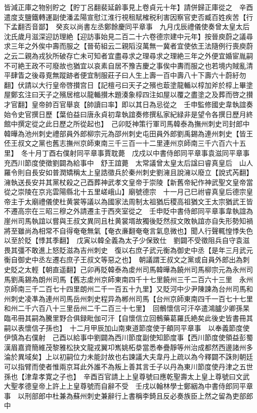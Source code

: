 皆減正庫之物别貯之【貯丁呂翻裴延齡事見上卷貞元十年】請併歸正庫從之　辛酉遣度支鹽鐵轉運副使潘孟陽宣慰江淮行視租賦榷税利害因察官吏否臧百姓疾苦【行下孟翻否音鄙】　癸亥以尚書左丞鄭餘慶同平章事　九月戊辰禮儀使奏曾太皇太后沈氏歲月滋深迎訪理絶【迎訪事始見二百二十六卷德宗建中元年】按晉庾蔚之議尋求三年之外俟中壽而服之【晉荀組云二親䧟沒萬無一冀者宜使依王法隨例行喪庾蔚之云二親為戎狄所破存亡未可知者宜盡尋求之理尋求之理絶三年之外便宜婚宦胤嗣不可絶王政不可廢故也猶宜以哀素自居不豫吉慶之事俟中夀而服之也若境内賊亂清平肆眚之後尋覔無蹤跡者便宜制服莊子曰人生上壽一百中壽八十下壽六十蔚紆勿翻】伏請以大行皇帝啓攅宫日【記檀弓曰天子之殯也菆塗龍輴以椁加斧於椁上畢塗屋鄭玄注曰天子之殯居棺以龍輴攅木題湊象椁四注如屋以覆之盡塗之及葬而啓之攅才官翻】皇帝帥百官舉哀【帥讀曰率】即以其日為忌從之　壬申監修國史韋執誼奏始令史官撰日歷【葉伯益曰唐永貞初韋執誼奏修撰私家紀緑非是望令各撰日歷月終館中撰定從之此日歷之所從起也】　己卯貶神策行軍司馬韓泰為撫州刺史司封郎中韓曄為池州刺史禮部員外郎柳宗元為邵州刺史屯田員外郎劉禹錫為連州刺史【皆王伾王叔文之黨也舊志撫州京師東南三千三百一十二里連州京師南三千六百六十五里】　冬十月丁酉右僕射同平章事賈耽薨　戊戍以中書侍郎同平章事袁滋同平章事充西川節度使徵劉闢為給事中　舒王誼薨　太常議曾太皇太后諡曰睿真皇后　山人羅令則自長安如普潤矯稱太上皇誥徵兵於秦州刺史劉澭且說澭以廢立【說式芮翻】澭執送長安并其黨杖殺之己酉葬神武孝文皇帝于崇陵【新舊帝紀作神武聖文皇帝當從之崇陵在京兆雲陽縣北十五里嵯峨山】廟號德宗　十一月己巳祔睿真皇后德宗皇帝主于太廟禮儀使杜黄裳等議以為國家法周制太祖猶后稷高祖猶文王太宗猶武王皆不遷高宗在三昭三穆之外請遷主于西夾室從之　壬申貶中書侍郎同平章事韋執誼為崖州司馬執誼以嘗與王叔文異同且杜黄裳壻故獨後貶然叔文敗執誼亦自失形勢知禍將至雖尚為相常不自得奄奄無氣【奄衣亷翻奄奄言氣息微也】聞人行聲輒惶悸失色以至於貶【悸其季翻】　戊寅以韓全義為太子少保致仕　劉闢不受徵阻兵自守袁滋畏其彊不敢進上怒貶滋為吉州刺史　復以右庶子武元衡為御史中丞【是年三月武元衡自御史中丞左遷右庶子王叔文等惡之也】　朝議謂王叔文之黨或自員外郎出為刺史貶之太輕【朝直遥翻】己卯再貶韓泰為䖍州司馬韓曄為饒州司馬柳宗元為永州司馬劉禹錫為朗州司馬【舊志䖍州京師東南四千十七里饒州三千二百六十三里　永州京師南三千二百七十四里朗州二千一百五十九里】又貶河中少尹陳諫為台州司馬和州刺史凌凖為連州司馬岳州刺史程异為郴州司馬【台州京師東南四千一百七十七里和州二千六百八十三里岳州二千二百三十七里】　回鶻懷信可汗卒遣鴻臚少卿孫杲臨弔冊其嗣為騰里野合俱録毗伽可汗【自懷信立回鶻藥葛羅氏絶矣此後史皆書冊其嗣以表懷信子孫也】　十二月甲辰加山南東道節度使于頔同平章事　以奉義節度使伊慎為右僕射　己酉以給事中劉闢為西川節度副使知節度事【西川節度使領益彭蜀漢眉嘉資簡維茂黎雅松抉文龍戎翼卭嶲姚柘㳟當悉奉疊靜等州治成都然西邊諸州多淪於異域矣】上以初嗣位力未能討故也右諫議大夫韋丹上疏以為今釋闢不誅則朝廷可以指臂而使者惟兩京耳此外誰不為叛上善其言壬子以丹為東川節度使丹津之五世孫也【津韋孝寛之子也】　辛酉百官請上上皇尊號曰應乾聖壽太上皇上尊號曰文武大聖孝德皇帝上許上上皇尊號而自辭不受　壬戌以翰林學士鄭絪為中書侍郎同平章事　以刑部郎中杜兼為蘇州刺史兼辭行上書稱李錡且反必奏族臣上然之留為吏部郎中

